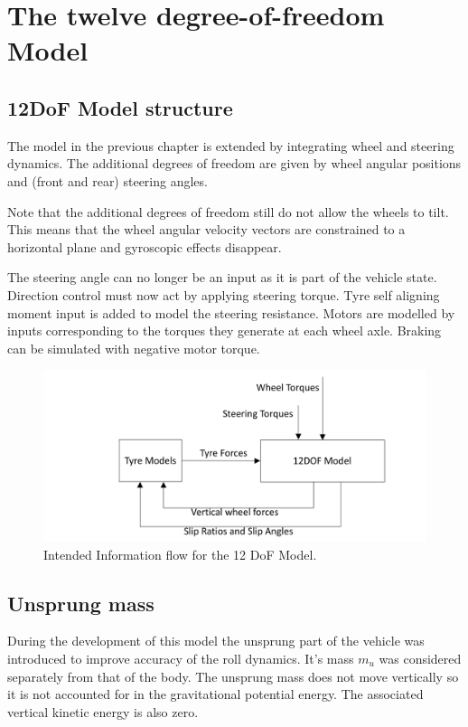 \chapter{The twelve degree-of-freedom Model}
\label{chap:12dof}
\section{12DoF Model structure}
\label{sec:12dofconcept}
The model in the previous chapter is extended by integrating wheel and steering dynamics.
The additional degrees of freedom are given by wheel angular positions and (front and rear) steering angles.

Note that the additional degrees of freedom still do not allow the wheels to tilt. This means that the wheel angular velocity vectors are constrained to a horizontal plane and gyroscopic effects disappear.

The steering angle can no longer be an input as it is part of the vehicle state. Direction control must now act by applying steering torque.
Tyre self aligning moment input is added to model the steering resistance.
Motors are modelled by inputs corresponding to the torques they generate at each wheel axle. Braking can be simulated with negative motor torque.
\begin{figure}[ht]
  \centering
  \includegraphics[width=\textwidth]{images/12flow}
  \caption{Intended Information flow for the 12 DoF Model.}
  \label{12flow}
\end{figure}

\section{Unsprung mass}
\label{sec:umass}
During the development of this model the unsprung part of the vehicle was introduced to improve accuracy of the roll dynamics. It's mass $m_u$ was considered separately from that of the body.
The unsprung mass does not move vertically so it is not accounted for in the gravitational potential energy. The associated vertical kinetic energy is also zero.

